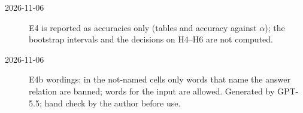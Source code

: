 \documentclass[11pt,a4paper]{article}
\begin{document}
\begin{description}
\item[2026-11-06] E4 is reported as accuracies only (tables and accuracy against $\alpha$); the bootstrap intervals and the decisions on H4--H6 are not computed.
\item[2026-11-06] E4b wordings: in the not-named cells only words that name the answer relation are banned; words for the input are allowed. Generated by GPT-5.5; hand check by the author before use.
\end{description}
\end{document}
